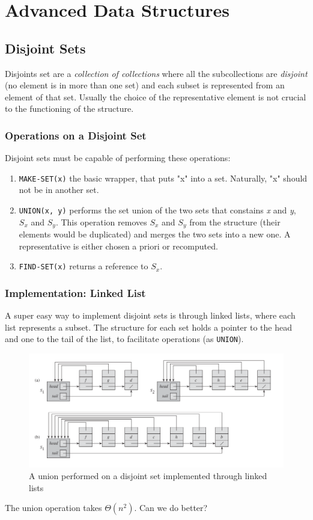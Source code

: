 \documentclass{article}
\begin{document}
	\section{Advanced Data Structures}
		\subsection{Disjoint Sets}
			Disjoints set are a \textit{collection of collections} where all the subcollections are \textit{disjoint} (no element is in more than one set) and each subset is represented from an element of that set. Usually the choice of the representative element is not crucial to the functioning of the structure.

			\subsubsection{Operations on a Disjoint Set}
				Disjoint sets must be capable of performing these operations:
				\begin{enumerate}
					\item \verb|MAKE-SET(x)| the basic wrapper, that puts "x" into a set. Naturally, "x" should not be in another set.
					\item \verb|UNION(x, y)| performs the set union of the two sets that constains \emph{x} and \emph{y}, $S_x$ and $S_y$. This operation removes $S_x$ and $S_y$ from the structure (their elements would be duplicated) and merges the two sets into a new one. A representative is either chosen a priori or recomputed.
					\item \verb|FIND-SET(x)| returns a reference to $S_x$.
				\end{enumerate}

			\subsubsection{Implementation: Linked List}
				A super easy way to implement disjoint sets is through linked lists, where each list represents a subset. The structure for each set holds a pointer to the head and one to the tail of the list, to facilitate operations (as \verb|UNION|).
				\begin{figure}[H]
					\centering
					\includegraphics[width = \textwidth]{images/union.png}
					\caption{A union performed on a disjoint set implemented through linked lists}
				\end{figure}
				The union operation takes $\Theta(n^2)$. Can we do better?
\end{document}
